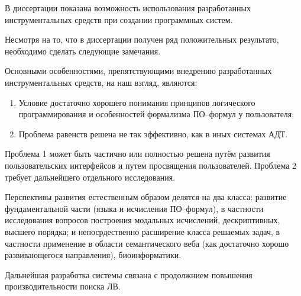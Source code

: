 В диссертации показана возможность использования разработанных инструментальных средств при создании программных систем.

Несмотря на то, что в диссертации получен ряд положительных результато, необходимо сделать следующие замечания.

Основными особенностями, препятствующими внедрению разработанных инструментальных средств, на наш взгляд, являются:

\begin{enumerate}
\item Условие достаточно хорошего понимания принципов логического программирования и особенностей формализма ПО--формул у пользователя;
\item Проблема равенств решена не так эффективно, как в иных системах АДТ. %
\end{enumerate}

Проблема 1 может быть частично или полностью решена путём развития пользовательских интерфейсов и путем просвящения пользователей. Проблема 2 требует дальнейшего отдельного исследования.



Перспективы развития естественным образом делятся на два класса: развитие фундаментальной части (языка и исчисления ПО--формул), в частности исследования вопросов построения модальных исчислений, дескриптивных, высшего порядка; и непосрдественно расширение класса решаемых задач, в частности применение в области семантического веба (как достаточно хорошо развивающегося направления), биоинформатики.

Дальнейшая разработка системы связана с продолжнием повышения производительности поиска ЛВ.


